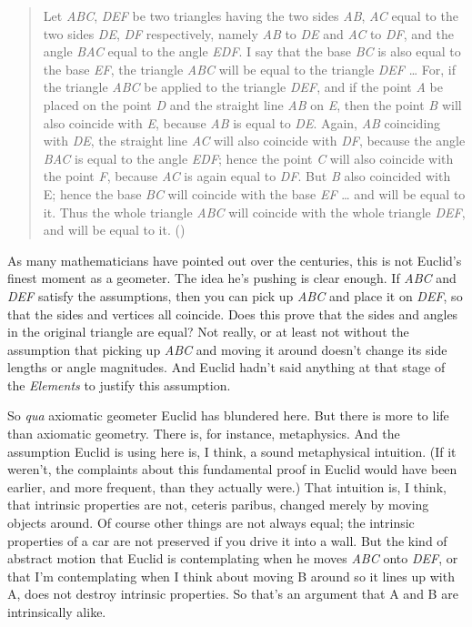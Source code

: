 \documentclass[
  11pt,
  letterpaper,
  DIV=11,
  numbers=noendperiod,
  twoside]{scrartcl}
\begin{document}
\begin{quote}
Let \emph{ABC}, \emph{DEF} be two triangles having the two sides
\emph{AB}, \emph{AC} equal to the two sides \emph{DE}, \emph{DF}
respectively, namely \emph{AB} to \emph{DE} and \emph{AC} to \emph{DF},
and the angle \emph{BAC} equal to the angle \emph{EDF}. I say that the
base \emph{BC} is also equal to the base \emph{EF}, the triangle
\emph{ABC} will be equal to the triangle \emph{DEF} \ldots{} For, if the
triangle \emph{ABC} be applied to the triangle \emph{DEF}, and if the
point \emph{A} be placed on the point \emph{D} and the straight line
\emph{AB} on \emph{E}, then the point \emph{B} will also coincide with
\emph{E}, because \emph{AB} is equal to \emph{DE}. Again, \emph{AB}
coinciding with \emph{DE}, the straight line \emph{AC} will also
coincide with \emph{DF}, because the angle \emph{BAC} is equal to the
angle \emph{EDF}; hence the point \emph{C} will also coincide with the
point \emph{F}, because \emph{AC} is again equal to \emph{DF}. But
\emph{B} also coincided with E; hence the base \emph{BC} will coincide
with the base \emph{EF} \ldots{} and will be equal to it. Thus the whole
triangle \emph{ABC} will coincide with the whole triangle \emph{DEF},
and will be equal to it. ()
\end{quote}

As many mathematicians have pointed out over the centuries, this is not
Euclid's finest moment as a geometer. The idea he's pushing is clear
enough. If \emph{ABC} and \emph{DEF} satisfy the assumptions, then you
can pick up \emph{ABC} and place it on \emph{DEF}, so that the sides and
vertices all coincide. Does this prove that the sides and angles in the
original triangle are equal? Not really, or at least not without the
assumption that picking up \emph{ABC} and moving it around doesn't
change its side lengths or angle magnitudes. And Euclid hadn't said
anything at that stage of the \emph{Elements} to justify this
assumption.

So \emph{qua} axiomatic geometer Euclid has blundered here. But there is
more to life than axiomatic geometry. There is, for instance,
metaphysics. And the assumption Euclid is using here is, I think, a
sound metaphysical intuition. (If it weren't, the complaints about this
fundamental proof in Euclid would have been earlier, and more frequent,
than they actually were.) That intuition is, I think, that intrinsic
properties are not, ceteris paribus, changed merely by moving objects
around. Of course other things are not always equal; the intrinsic
properties of a car are not preserved if you drive it into a wall. But
the kind of abstract motion that Euclid is contemplating when he moves
\emph{ABC} onto \emph{DEF}, or that I'm contemplating when I think about
moving B around so it lines up with A, does not destroy intrinsic
properties. So that's an argument that A and B are intrinsically alike.
\end{document}
